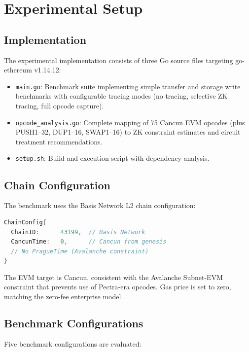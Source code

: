 
\section{Experimental Setup}

\subsection{Implementation}

The experimental implementation consists of three Go source files targeting
go-ethereum v1.14.12:

\begin{itemize}
  \item \texttt{main.go}: Benchmark suite implementing simple transfer and
    storage write benchmarks with configurable tracing modes (no tracing,
    selective ZK tracing, full opcode capture).
  \item \texttt{opcode\_analysis.go}: Complete mapping of 75 Cancun EVM opcodes
    (plus PUSH1--32, DUP1--16, SWAP1--16) to ZK constraint estimates and
    circuit treatment recommendations.
  \item \texttt{setup.sh}: Build and execution script with dependency analysis.
\end{itemize}

\subsection{Chain Configuration}

The benchmark uses the Basis Network L2 chain configuration:

\begin{lstlisting}[language=Go,caption={Basis L2 chain configuration}]
ChainConfig{
  ChainID:      43199,  // Basis Network
  CancunTime:   0,      // Cancun from genesis
  // No PragueTime (Avalanche constraint)
}
\end{lstlisting}

The EVM target is Cancun, consistent with the Avalanche Subnet-EVM constraint
that prevents use of Pectra-era opcodes. Gas price is set to zero, matching
the zero-fee enterprise model.

\subsection{Benchmark Configurations}

Five benchmark configurations are evaluated:

